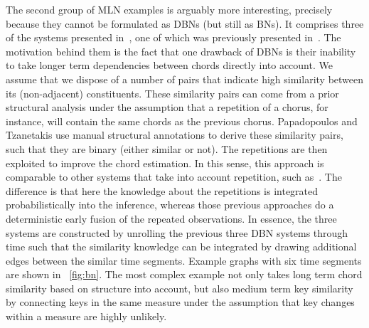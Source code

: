 \documentclass[letterpaper]{article} %
\newcommand{\figref}[1]{\figurename~\ref{fig:#1}} %
\begin{document}
The second group of MLN examples is arguably more interesting, precisely because they cannot be formulated as DBNs (but still as BNs). It comprises three of the systems presented in~\cite{papadopoulos2017taslp}, one of which was previously presented in~\cite{papadopoulos2013icassp}. The motivation behind them is the fact that one drawback of DBNs is their inability to take longer term dependencies between chords directly into account. We assume that we dispose of a number of pairs that indicate high similarity between its (non-adjacent) constituents. These similarity pairs can come from a prior structural analysis under the assumption that a repetition of a chorus, for instance, will contain the same chords as the previous chorus. Papadopoulos and Tzanetakis use manual structural annotations to derive these similarity pairs, such that they are binary (either similar or not). The repetitions are then exploited to improve the chord estimation. In this sense, this approach is comparable to other systems that take into account repetition, such as~\cite{mauch2009ismir,cho2011ismir}. The difference is that here the knowledge about the repetitions is integrated probabilistically into the inference, whereas those previous approaches do a deterministic early fusion of the repeated observations.  In essence, the three systems are constructed by unrolling the previous three DBN systems through time such that the similarity knowledge can be integrated by drawing additional edges between the similar time segments. Example graphs with six time segments are shown in \figref{bn}. The most complex example not only takes long term chord similarity based on structure into account, but also medium term key similarity by connecting keys in the same measure under the assumption that key changes within a measure are highly unlikely.
\end{document}

